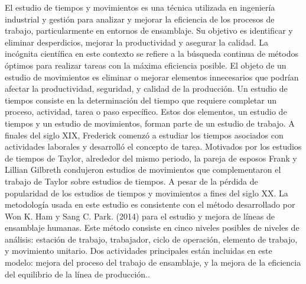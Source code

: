     El estudio de tiempos y movimientos es una técnica utilizada en ingeniería industrial y gestión para analizar y mejorar la eficiencia de los procesos de trabajo, particularmente en entornos de ensamblaje. Su objetivo es identificar y eliminar desperdicios, mejorar la productividad y asegurar la calidad. La incógnita científica en este contexto se refiere a la búsqueda continua de métodos óptimos para realizar tareas con la máxima eficiencia posible. El objeto de un estudio de movimientos es eliminar o mejorar elementos innecesarios que podrían afectar la productividad, seguridad, y calidad de la producción. Un estudio de tiempos consiste en la determinación del tiempo que requiere completar un proceso, actividad, tarea o paso específico. Estos dos elementos, un estudio de tiempos y un estudio de movimientos, forman parte de un estudio de trabajo. A finales del siglo XIX, Frederick comenzó a estudiar los tiempos asociados con actividades laborales y desarrolló el concepto de tarea. Motivados por los estudios de tiempos de Taylor, alrededor del mismo periodo, la pareja de esposos Frank y Lillian Gilbreth condujeron estudios de movimientos que complementaron el trabajo de Taylor sobre estudios de tiempos. A pesar de la pérdida de popularidad de los estudios de tiempos y movimientos a fines del siglo XX. La metodología usada en este estudio es consistente con el método desarrollado por Won K. Ham y Sang C. Park. (2014) para el estudio y mejora de líneas de ensamblaje humanas. Este método consiste en cinco niveles posibles de niveles de análisis: estación de trabajo, trabajador, ciclo de operación, elemento de trabajo, y movimiento unitario. Dos actividades principales están incluidas en este modelo: mejora del proceso del trabajo de ensamblaje, y la mejora de la eficiencia del equilibrio de la línea de producción.\cite{FromScientificManagementtoHomemaking}.
